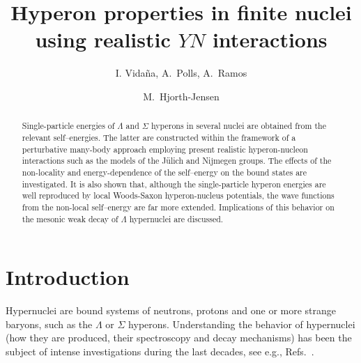 


\draft


\title{Hyperon properties in finite nuclei using 
       realistic $YN$ interactions}

\author{I. Vida\~na, A.\ Polls, A.\ Ramos}

\address{Departament d'Estructura i Constituents de la Mat\`eria,
         Universitat de Barcelona, E-08028 Barcelona, Spain}


\author{M.\ Hjorth-Jensen}


\address{ Nordita, Blegdamsvej 17, DK-2100 K\o benhavn \O, Denmark}



\maketitle
\bigskip

\begin{abstract}
Single-particle energies of $\Lambda$ and $\Sigma$ hyperons
in several nuclei are obtained from the relevant
self--energies.
The latter are constructed within the framework of a perturbative
many-body approach  
employing present realistic hyperon-nucleon interactions
such as the models of the J\"{u}lich and Nijmegen groups.
The effects of the non-locality and
energy-dependence of the self--energy on the bound states are
investigated.
It is also shown that, although the single-particle hyperon energies are well
reproduced by local Woods-Saxon hyperon-nucleus potentials, the wave functions
from the non-local self--energy are far more extended. Implications of
this
behavior on the mesonic weak decay of $\Lambda$ hypernuclei are discussed.
\end{abstract}

\bigskip
{}
\bigskip
\newpage


\section{Introduction}

Hypernuclei are bound systems of neutrons, protons and one or more strange 
baryons, such as the $\Lambda$ or $\Sigma$ hyperons. Understanding the
behavior of hypernuclei (how they are produced, their spectroscopy and
decay mechanisms) has been the subject of intense investigations
during the last decades, see e.g., Refs.\
\cite{gal77,povh78,bando85,dover89,oset90,cohen90,bando90,gibson95,akaishi97,oset98}.

